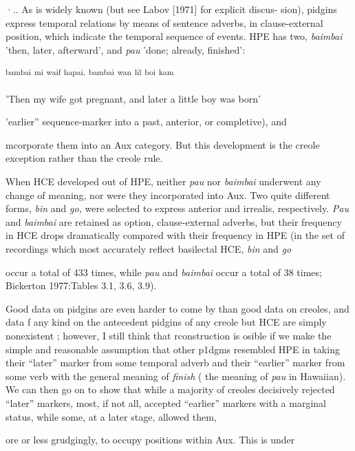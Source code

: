 ·.. As is widely known (but see Labov [1971] for explicit discus- sion), pidgins express temporal relations by means of sentence adverbs, in clause-external position, which indicate the temporal sequence of events. HPE has two, \textit{baimbai} 'then, later, afterward', and \textit{pau} 'done; already, finished':

\ea\label{ex:92}
 \textsuperscript{bambai} \textsuperscript{mi} \textsuperscript{waif} \textsuperscript{hapai,} \textsuperscript{bambai} \textsuperscript{wan} \textsuperscript{lil} \textsuperscript{boi} \textsuperscript{kam}
\glt
\z

'Then my wife got pregnant, and later a little boy was born'


'earlier'' sequence-marker into a past, anterior, or completive), and

mcorporate them into an Aux category. But this development is the creole exception rather than the creole rule.

When HCE developed out of HPE, neither \textit{pau} nor \textit{baimbai} underwent any change of meaning, nor were they incorporated into Aux. Two quite different forms, \textit{bin }and \textit{go,} were selected to express anterior and irrealis, respectively. \textit{Pau} and \textit{baimbai} are retained as option, clause-external adverbs, but their frequency in HCE drops dramatically compared with their frequency in HPE (in the set of recordings which most accurately reflect basilectal HCE, \textit{bin} and \textit{go}

occur a total of 433 times, while \textit{pau }and \textit{baimbai} occur a total of 38 times; Bickerton 1977:Tables 3.1, 3.6, 3.9).

Good data on pidgins are even harder to come by than good data on creoles, and data f any kind on the antecedent pidgins of any creole but HCE are simply nonexistent ; however, I still think that rconstruction is osible if we make the simple and reasonable assump\-tion that other p1dgms resembled HPE in taking their ``later'' marker from some temporal adverb and their ``earlier'' marker from some verb with the general meaning of \textit{finish }( the meaning of \textit{pau} in Hawaiian). We can then go on to show that while a majority of creoles decisively rejected ``later'' markers, most, if not all, accepted ``earlier'' markers with a marginal status, while some, at a later stage, allowed them,

ore or less grudgingly, to occupy positions within Aux. This is under\-

